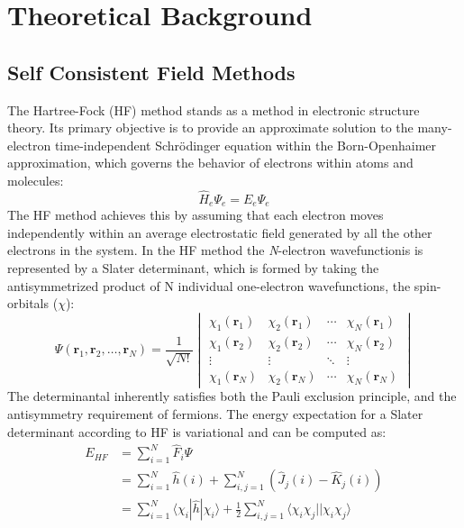 \chapter{Theoretical Background}\label{ch:theory}

\section{Self Consistent Field Methods} \label{sec:SCF}
The Hartree-Fock (HF) method stands as a method in electronic structure theory. Its primary objective is to provide an approximate solution to the many-electron time-independent Schrödinger equation within the Born-Openhaimer approximation, which governs the behavior of electrons within atoms and molecules:
\begin{equation}\label{eq:TISE}
    \hat{H}_e \Psi_e = E_e \Psi_e
\end{equation}
The HF method achieves this by assuming that each electron moves independently within an average electrostatic field generated by all the other electrons in the system. In the HF method the \textit{N}-electron wavefunctionis is represented by a Slater determinant, which is formed by taking the antisymmetrized product of N individual one-electron wavefunctions, the spin-orbitals ($\chi$):
\begin{equation}\label{eq:SlaterDet}
    \Psi(\mathbf{r}_1, \mathbf{r}_2, \dots, \mathbf{r}_N) = \frac{1}{\sqrt{N!}}
    \begin{vmatrix}
      \chi_1(\mathbf{r}_1) & \chi_2(\mathbf{r}_1) & \cdots & \chi_N(\mathbf{r}_1) \\
      \chi_1(\mathbf{r}_2) & \chi_2(\mathbf{r}_2) & \cdots & \chi_N(\mathbf{r}_2) \\
      \vdots & \vdots & \ddots & \vdots \\
      \chi_1(\mathbf{r}_N) & \chi_2(\mathbf{r}_N) & \cdots & \chi_N(\mathbf{r}_N)
    \end{vmatrix}
  \end{equation}
The determinantal inherently satisfies both the Pauli exclusion principle, and the antisymmetry requirement of fermions. The energy expectation for a Slater determinant according to HF is variational and can be computed as:
\begin{equation}\label{EHF}
    \begin{aligned}
        E_{HF} &= \sum_{i=1}^{N} \hat{F}_i \Psi \\
            &= \sum_{i=1}^{N} \hat{h}(i) + \sum_{i,j=1}^{N} (\hat{J}_j(i) - \hat{K}_j(i)) \\ 
            &= \sum_{i=1}^{N} \langle \chi_i | \hat{h} | \chi_i \rangle + \frac{1}{2} \sum_{i,j=1}^{N} \langle \chi_i \chi_j || \chi_i \chi_j \rangle
    \end{aligned}
\end{equation}
